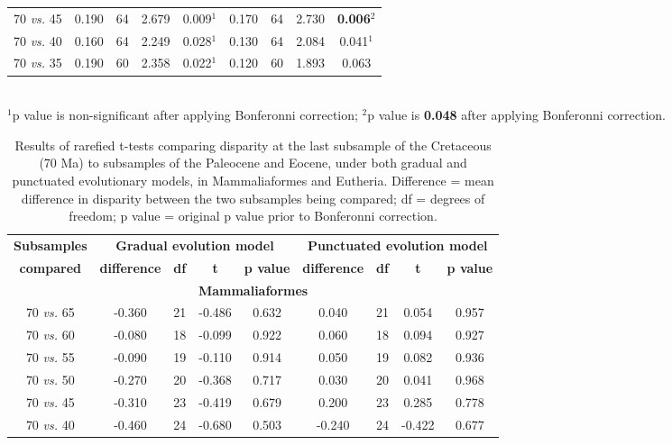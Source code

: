 \begin{table}[ht]
\begin{tabular}{c|cccc|cccc}
  70 \textit{vs.} 45 & 0.190 & 64 & 2.679 & 0.009$^1$ & 0.170 & 64 & 2.730 & \textbf{0.006}$^2$ \\ 
  70 \textit{vs.} 40 & 0.160 & 64 & 2.249 & 0.028$^1$ & 0.130 & 64 & 2.084 & 0.041$^1$ \\ 
  70 \textit{vs.} 35 & 0.190 & 60 & 2.358 & 0.022$^1$ & 0.120 & 60 & 1.893 & 0.063 \\ 
   \hline
\end{tabular} \\
   \small{$^1$p value is non-significant after applying Bonferonni correction;
   $^2$p value is \textbf{0.048} after applying Bonferonni correction.}
\end{table}

\begin{table}[ht]
\caption[Effect of the K-Pg boundary on mammlian disparity (rarefied)]{Results of rarefied t-tests comparing disparity at the last subsample of the Cretaceous (70 Ma) to subsamples of the Paleocene and Eocene, under both gradual and punctuated evolutionary models, in Mammaliaformes and Eutheria. Difference = mean difference in disparity between the two subsamples being compared; df = degrees of freedom; p value = original p value prior to Bonferonni correction.}
\label{tab:Tab_rare}
\centering
\begin{tabular}{c|cccc|cccc}
  \hline
  \textbf{Subsamples} & \multicolumn{4}{c|}{\textbf{Gradual evolution model}} & \multicolumn{4}{c}{\textbf{Punctuated evolution model}} \\
  \textbf{compared} & \textbf{difference} & \textbf{df} & \textbf{t} & \textbf{p value} & \textbf{difference} & \textbf{df} & \textbf{t} & \textbf{p value} \\ 
  \hline
  \multicolumn{9}{c}{\textbf{Mammaliaformes}}\\
  \hline
  70 \textit{vs.} 65 & -0.360 & 21 & -0.486 & 0.632 & 0.040 & 21 & 0.054 & 0.957 \\ 
  70 \textit{vs.} 60 & -0.080 & 18 & -0.099 & 0.922 & 0.060 & 18 & 0.094 & 0.927 \\ 
  70 \textit{vs.} 55 & -0.090 & 19 & -0.110 & 0.914 & 0.050 & 19 & 0.082 & 0.936 \\ 
  70 \textit{vs.} 50 & -0.270 & 20 & -0.368 & 0.717 & 0.030 & 20 & 0.041 & 0.968 \\ 
  70 \textit{vs.} 45 & -0.310 & 23 & -0.419 & 0.679 & 0.200 & 23 & 0.285 & 0.778 \\ 
  70 \textit{vs.} 40 & -0.460 & 24 & -0.680 & 0.503 & -0.240 & 24 & -0.422 & 0.677 \\ 

\end{tabular}
\end{table}
